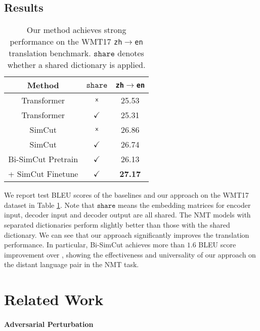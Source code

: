 \documentclass[11pt]{article}
\begin{document}
\subsection{Results}

\begin{table}
\centering
\begin{tabular}{c|c|c}
\hline
Method & $\texttt{share}$ & \texttt{zh}$\rightarrow$\texttt{en} \\
\hline\hline
Transformer & $\text{\sffamily x}$ & 25.53 \\
Transformer & $\checkmark$ & 25.31 \\
\hline
SimCut & $\text{\sffamily x}$ & 26.86 \\ SimCut & $\checkmark$ & 26.74 \\ Bi-SimCut Pretrain & $\checkmark$ & 26.13 \\
+ SimCut Finetune & $\checkmark$ & \bf 27.17 \\
\end{tabular}
\caption{Our method achieves strong performance on the WMT17 \texttt{zh}$\rightarrow$\texttt{en} translation benchmark. $\texttt{share}$ denotes whether a shared dictionary is applied. \label{zhen}}
\end{table}

We report test BLEU scores of the baselines and our approach on the WMT17 dataset in Table \ref{zhen}. Note that $\texttt{share}$ means the embedding matrices for encoder input, decoder input and decoder output are all shared.
The NMT models with separated dictionaries perform slightly better than those with the shared dictionary. We can see that our approach significantly improves the translation performance. In particular, Bi-SimCut achieves more than $1.6$ BLEU score improvement over \citet{vaswani2017attention}, showing the effectiveness and universality of our approach on the distant language pair in the NMT task.


\section{Related Work}

\paragraph{Adversarial Perturbation}
\end{document}
